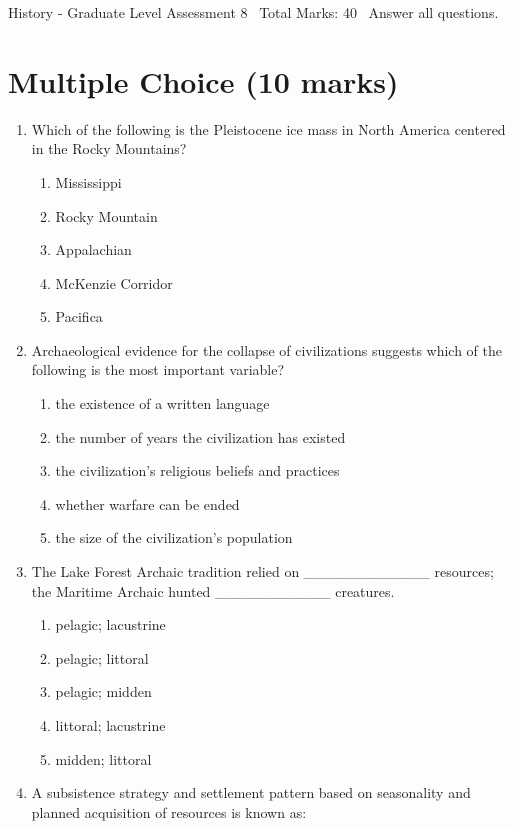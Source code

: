 \documentclass[12pt]{article}
\begin{document}
\begin{center}
History - Graduate Level Assessment 8 \
Total Marks: 40 \
Answer all questions.
\end{center}

\section*{Multiple Choice (10 marks)}
\begin{enumerate}[label=\arabic*.]
\item Which of the following is the Pleistocene ice mass in North America centered in the Rocky Mountains?
\begin{enumerate}[label=(\alph*)]
    \item Mississippi
    \item Rocky Mountain
    \item Appalachian
    \item McKenzie Corridor
    \item Pacifica
\end{enumerate}
\item Archaeological evidence for the collapse of civilizations suggests which of the following is the most important variable?
\begin{enumerate}[label=(\alph*)]
    \item the existence of a written language
    \item the number of years the civilization has existed
    \item the civilization's religious beliefs and practices
    \item whether warfare can be ended
    \item the size of the civilization's population
\end{enumerate}
\item The Lake Forest Archaic tradition relied on \_\_\_\_\_\_\_\_\_\_\_\_ resources; the Maritime Archaic hunted \_\_\_\_\_\_\_\_\_\_\_ creatures.
\begin{enumerate}[label=(\alph*)]
    \item pelagic; lacustrine
    \item pelagic; littoral
    \item pelagic; midden
    \item littoral; lacustrine
    \item midden; littoral
\end{enumerate}
\item A subsistence strategy and settlement pattern based on seasonality and planned acquisition of resources is known as:

\end{enumerate}
\end{document}
